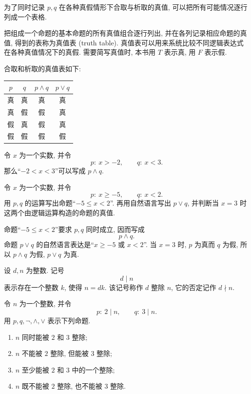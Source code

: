 \documentclass[usesamecnt, thmcnt=section, lang=cn, newtx, 10pt, scheme=chinese]{elegantbook}
\begin{document}
为了同时记录 $p,q$ 在各种真假情形下合取与析取的真值, 可以把所有可能情况逐行列成一个表格.

\begin{notation}[真值表]
把组成一个命题的基本命题的所有真值组合逐行列出, 并在各列记录相应命题的真值, 得到的表称为{\color{blue}真值表 (truth table)}. 真值表可以用来系统比较不同逻辑表达式在各种真值情况下的真假. 需要简写真值时, 本书用 $T$ 表示真, 用 $F$ 表示假.
\end{notation}

合取和析取的真值表如下:
\begin{table}[H]
\centering
\begin{tabular}{|c|c|c|c|}
\hline
$p$ & $q$ & $p\wedge q$ & $p\vee q$\\
\hline
真 & 真 & 真 & 真\\
真 & 假 & 假 & 真\\
假 & 真 & 假 & 真\\
假 & 假 & 假 & 假\\
\hline
\end{tabular}
\end{table}

\begin{instance}
令 $x$ 为一个实数, 并令
\[
 p:\ x>-2,\qquad q:\ x<3.
\]
那么``$-2<x<3$''可以写成 $p\wedge q$.
\end{instance}

\begin{concept}
\label{con:logic-03}
令 $x$ 为一个实数, 并令
\[
 p:\ x\geq -5,\qquad q:\ x<2.
\]
用 $p,q$ 的运算写出命题``$-5\leq x<2$''. 再用自然语言写出 $p\vee q$, 并判断当 $x=3$ 时这两个由逻辑运算构造的命题的真值.
\end{concept}

\begin{solution}
命题``$-5\leq x<2$''要求 $p,q$ 同时成立, 因而写成
\[
 p\wedge q.
\]
命题 $p\vee q$ 的自然语言表达是``$x\geq-5$ 或 $x<2$''.
当 $x=3$ 时, $p$ 为真而 $q$ 为假, 所以 $p\wedge q$ 为假, $p\vee q$ 为真.
\end{solution}

\begin{notation}[整除记号]
设 $d,n$ 为整数. 记号
\[
 d\mid n
\]
表示存在一个整数 $k$, 使得 $n=dk$. 该记号称作 $d$ 整除 $n$, 它的否定记作 $d\nmid n$.
\end{notation}

\begin{exercise}
\label{ex:logic-03}
令 $n$ 为一个整数, 并令
\[
 p:\ 2\mid n,\qquad q:\ 3\mid n.
\]
用 $p,q,\neg,\wedge,\vee$ 表示下列命题.
\begin{enumerate}[label=\rm(\arabic*)]
  \item $n$ 同时能被 $2$ 和 $3$ 整除;
  \item $n$ 不能被 $2$ 整除, 但能被 $3$ 整除;
  \item $n$ 至少能被 $2$ 和 $3$ 中的一个整除;
  \item $n$ 既不能被 $2$ 整除, 也不能被 $3$ 整除.
\end{enumerate}
\end{exercise}
\end{document}
